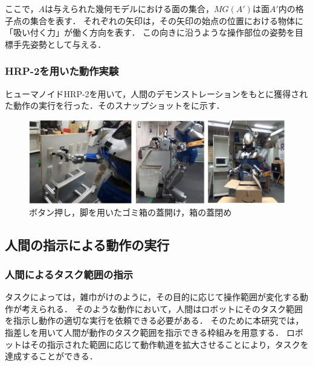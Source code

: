\documentclass[twocolumn]{preport}
\newcommand{\equref}[1]{(\ref{equation:#1})式}
\begin{document}
ここで，\(A\)は与えられた幾何モデルにおける面の集合，\(MG(A')\)は面\(A'\)内の格子点の集合を表す．
それぞれの矢印は，その矢印の始点の位置における物体に「吸い付く力」が働く方向を表す．
この向きに沿うような操作部位の姿勢を目標手先姿勢として与える．


\subsubsection{HRP-2を用いた動作実験}
ヒューマノイドHRP-2を用いて，人間のデモンストレーションをもとに獲得された動作の実行を行った．そのスナップショットをに示す．

\begin{figure}[htbp]
  \begin{center}
    \includegraphics[width=1.0\columnwidth]{figs/experiments}
    \caption{ボタン押し，脚を用いたゴミ箱の蓋開け，箱の蓋閉め}
    \label{figure:experiments}
  \end{center}
\end{figure}

\subsection{人間の指示による動作の実行}
\subsubsection{人間によるタスク範囲の指示}
タスクによっては，雑巾がけのように，その目的に応じて操作範囲が変化する動作が考えられる．
そのような動作において，人間はロボットにそのタスク範囲を指示し動作の適切な実行を依頼できる必要がある．
そのために本研究では，%
指差しを用いて人間が動作のタスク範囲を指示できる枠組みを用意する．
ロボットはその指示された範囲に応じて動作軌道を拡大させることにより，タスクを達成することができる．
\end{document}
